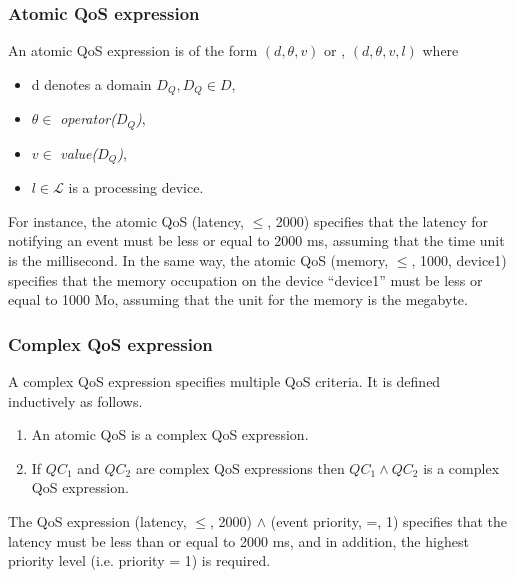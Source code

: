 \subsubsection{Atomic QoS expression} 
An atomic QoS expression is of the form $(d, \theta, v)$ or , $(d, \theta, v, l)$ where 
\begin{itemize}
 \item d denotes a domain $D_Q , D_Q \in D$,
 \item $\theta \in$ \textit{operator($D_Q$)},
 \item $v \in$ \textit{value($D_Q$)},
 \item $l \in \mathcal{L}$ is a processing device.
\end{itemize}
For instance, the atomic QoS (latency, $\leq$, 2000) specifies that the latency for notifying an event must be less or equal to 2000 ms, assuming that the time unit is the millisecond. In the same way, the atomic QoS (memory, $\leq$, 1000, device1) specifies that the memory occupation on the device ``device1'' must be less or equal to 1000 Mo, assuming that the unit for the memory is the megabyte.  

\subsubsection{Complex QoS expression} 
A complex QoS expression specifies multiple QoS criteria. It is defined inductively as follows.
\begin{enumerate}
 \item An atomic QoS is a complex QoS expression.
 \item If $QC_1$ and $QC_2$ are complex QoS expressions then $QC_1 \wedge QC_2$ is a complex QoS expression.
\end{enumerate}
 The QoS expression (latency, $\leq$, 2000) $\wedge$ (event priority, =, 1) specifies that the latency must be less than or equal to 2000 ms, and in addition, the highest priority level (i.e. priority = 1) is required.
